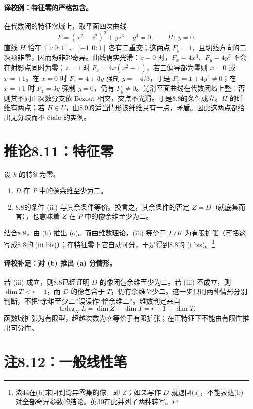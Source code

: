 \documentclass[openany,fontset=fandol]{ctexbook}
\newcommand{\PD}{\check P}
\begin{document}
\newpage
\paragraph{译校例：特征零的严格包含。}
在代数闭的特征零域上，取平面四次曲线
\[
 F=(x^2-z^2)^2+yz^3+y^4=0,
 \qquad H:\ y=0.
\]
直线 $H$ 恰在 $[1:0:1]$、$[-1:0:1]$ 各有二重交；这两点 $F_y=1$，且切线方向的二次项非零，因而均非超奇异。曲线确实光滑：$z=0$ 时，$F_x=4x^3$、$F_y=4y^3$ 不会在射影点同时为零；$z=1$ 时 $F_x=4x(x^2-1)$，若三偏导都为零则 $x=0$ 或 $x=\pm1$。在 $x=0$ 时 $F_z=4+3y$ 强制 $y=-4/3$，于是 $F_y=1+4y^3\ne0$；在 $x=\pm1$ 时 $F_z=3y$ 强制 $y=0$，仍有 $F_y\ne0$。光滑平面曲线在代数闭域上整：否则其不同正次数分支依 Bézout 相交，交点不光滑。于是8.8的条件成立。$H$ 的纤维有两点；若 $H\in U$，由8.9的适当情形该纤维只有一点，矛盾。因此这两点都给出无分歧而不 étale 的实例。

\section*{推论8.11：特征零}
设 $k$ 的特征为零。
\begin{enumerate}
\renewcommand{\labelenumi}{(\alph{enumi})}
\item $D$ 在 $\PD$ 中的像余维至少为二。
\item 8.8的条件 (iii) 与其余条件等价。换言之，其余条件的否定 $Z=D$（就底集而言），也意味着 $Z$ 在 $\PD$ 中的像余维至少为二。
\end{enumerate}
结合8.8，由 (b) 推出 (a)。而由维数理论，(iii) 等价于 $L/K$ 为有限扩张（可把这写成8.8的 (iii bis)）；在特征零下它自动可分，于是得到8.8的 (i bis)。\footnote{法44在(b)末回到奇异零集的像，即 $Z$；如果写作 $D$ 就退回(a)，不能表达(b)对全部奇异参数的结论。英30在此并列了两种转写。}

\paragraph{译校补足：对 (b) 推出 (a) 分情形。}
若 (iii) 成立，则8.8已经证明 $D$ 的像闭包余维至少为二。若 (iii) 不成立，则 $\dim T<r-1$，而 $D$ 的像包含于 $T$，仍有余维至少二。这一步只用两种情形分别判断，不把“余维至少二”误读作“恰余维二”。维数判定来自
\[
 \operatorname{trdeg}_K L=\dim Z-\dim T=r-1-\dim T.
\]
函数域扩张为有限型，超越次数为零等价于有限扩张；在正特征下不能由有限性推出可分性。

\newpage
\section*{注8.12：一般线性笔}
\end{document}
